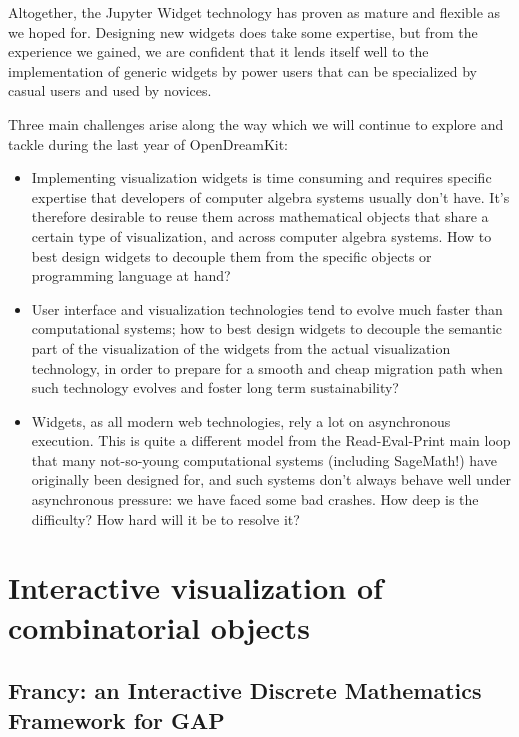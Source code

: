 \documentclass{deliverablereport}
\begin{document}
Altogether, the Jupyter Widget technology has proven as mature and
flexible as we hoped for. Designing new widgets does take some
expertise, but from the experience we gained, we are confident that it
lends itself well to the implementation of generic widgets by power
users that can be specialized by casual users and used by novices.

Three main challenges arise along the way which we will continue to
explore and tackle during the last year of OpenDreamKit:
\begin{itemize}
\item Implementing visualization widgets is time consuming and
  requires specific expertise that developers of computer algebra
  systems usually don't have. It's therefore desirable to reuse them
  across mathematical objects that share a certain type of
  visualization, and across computer algebra systems. How to best
  design widgets to decouple them from the specific objects or
  programming language at hand?
\item User interface and visualization technologies tend to evolve
  much faster than computational systems; how to best design widgets
  to decouple the semantic part of the visualization of the widgets
  from the actual visualization technology, in order to prepare for a
  smooth and cheap migration path when such technology evolves and
  foster long term sustainability?
\item Widgets, as all modern web technologies, rely a lot on
  asynchronous execution. This is quite a different model from the
  Read-Eval-Print main loop that many not-so-young computational
  systems (including SageMath!) have originally been designed for, and
  such systems don't always behave well under asynchronous pressure:
  we have faced some bad crashes. How deep is the difficulty? How hard
  will it be to resolve it?
\end{itemize}

\section{Interactive visualization of combinatorial objects}
\label{section:combi}

\subsection{Francy: an Interactive Discrete Mathematics Framework for GAP}
\label{section:francy}
\end{document}
